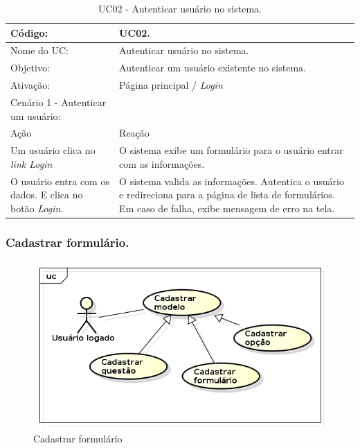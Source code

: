 \documentclass[11pt]{article}
\begin{document}
        \begin{table}[h]
          \begin{center}
            \begin{tabular}{ | p{7cm} | p{8cm} | }
              \hline
              Código: \cellcolor{gray} & UC02. \\
              \hline
              Nome do UC: \cellcolor{gray} & Autenticar usuário no sistema. \\
              \hline
              Objetivo: \cellcolor{gray} & Autenticar um usuário existente no sistema. \\
              \hline
              Ativação: \cellcolor{gray} & Página principal / \em Login \\
              \hline
              \hline
              Cenário 1 - Autenticar um usuário: &  \\
              \hline
              Ação\cellcolor{gray} & Reação\cellcolor{gray} \\
              \hline
              Um usuário clica no \em link Login & O sistema exibe um formulário para o usuário entrar com as informações. \\
              \hline
              O usuário entra com os dados. E clica no botão {\em Login}. & O sistema valida as informações. Autentica o usuário e redireciona para a página de lista de formulários. Em caso de falha, exibe mensagem de erro na tela. \\
              \hline
            \end{tabular}
            \caption{UC02 - Autenticar usuário no sistema.}
          \end{center}
        \end{table}

    \clearpage

      \subsubsection{Cadastrar formulário.}

        \begin{figure}[h!]
          \centering
          \includegraphics[width=.5\textwidth]{cadastrar.png}
          \caption{Cadastrar formulário}
        \end{figure}
\end{document}
